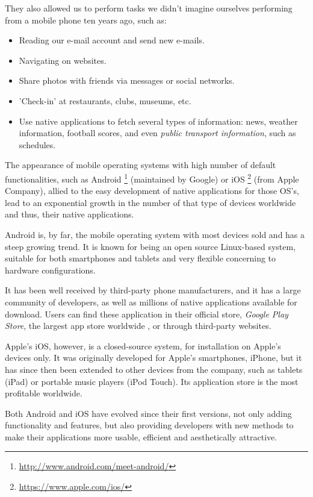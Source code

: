 They also allowed us to perform tasks we didn't imagine ourselves performing from a mobile phone ten years ago, such as:

\begin{itemize}
\item Reading our e-mail account and send new e-mails.
\item Navigating on websites.
\item Share photos with friends via messages or social networks.
\item 'Check-in' at restaurants, clubs, museums, etc.
\item Use native applications to fetch several types of information: news, weather information, football scores, and even \emph{public transport information}, such as schedules.
\end{itemize}

The appearance of mobile operating systems with high number of default functionalities, such as Android \footnote{\url{http://www.android.com/meet-android/}} (maintained by Google) or iOS \footnote{\url{https://www.apple.com/ios/}} (from Apple Company), allied to the easy development of native applications for those OS's, lead to an exponential growth in the number of that type of devices worldwide and thus, their native applications.

Android is, by far, the mobile operating system with most devices sold \cite{kn:McC13}\cite{kn:McG13} and has a steep growing trend. It is known for being an open source Linux-based system, suitable for both smartphones and tablets and very flexible concerning to hardware configurations.

It has been well received by third-party phone manufacturers, and it has a large community of developers, as well as millions of native applications available for download. Users can find these application in their official store, \emph{Google Play Store}, the largest app store worldwide \cite{kn:Are13}, or through third-party websites.

Apple's iOS, however, is a closed-source system, for installation on Apple's devices only. 
It was originally developed for Apple's smartphones, iPhone, but it has since then been extended to other devices from the company, such as tablets (iPad) or portable music players (iPod Touch). Its application store is the most profitable worldwide.

Both Android and iOS have evolved since their first versions, not only adding functionality and features, but also providing developers with new methods to make their applications more usable, efficient and aesthetically attractive.


